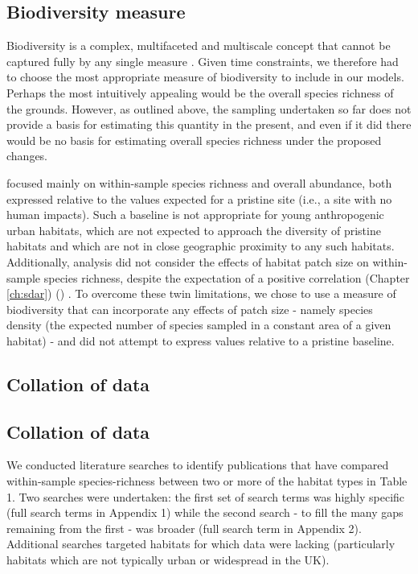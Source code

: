 \subsection*{Biodiversity measure}
\fi

Biodiversity is a complex, multifaceted and multiscale concept that cannot be captured fully by any single measure \citep{Purvis:2000nat}. Given time constraints, we therefore had to choose the most appropriate measure of biodiversity to include in our models. Perhaps the most intuitively appealing would be the overall species richness of the grounds. However, as outlined above, the sampling undertaken so far does not provide a basis for estimating this quantity in the present, and even if it did there would be no basis for estimating overall species richness under the proposed changes.

\cite{Newbold:2015nat} focused mainly on within-sample species richness and overall abundance, both expressed relative to the values expected for a pristine site (i.e., a site with no human impacts). Such a baseline is not appropriate for young anthropogenic urban habitats, which are not expected to approach the diversity of pristine habitats and which are not in close geographic proximity to any such habitats. Additionally, \cite{Newbold:2015nat} analysis did not consider the effects of habitat patch size on within-sample species richness, despite the expectation of a positive correlation 
\ifappendixStyle %
(Chapter \ref{ch:sdar})%
\else
(\citealt{Phillips:2015sdar})
\fi
. To overcome these twin limitations, we chose to use a measure of biodiversity that can incorporate any effects of patch size - namely species density (the expected number of species sampled in a constant area of a given habitat) - and did not attempt to express values relative to a pristine baseline.

\ifappendixStyle %
\subsection{Collation of data}%
\else
\subsection*{Collation of data}
\fi

We conducted literature searches to identify publications that have compared within-sample species-richness between two or more of the habitat types in Table 1. Two searches were undertaken: the first set of search terms was highly specific (full search terms in Appendix 1) while the second search - to fill the many gaps remaining from the first - was broader (full search term in Appendix 2). Additional searches targeted habitats for which data were lacking (particularly habitats which are not typically urban or widespread in the UK).

